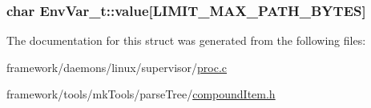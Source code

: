 \subsubsection[{\texorpdfstring{value}{value}}]{\setlength{\rightskip}{0pt plus 5cm}char Env\+Var\+\_\+t\+::value\mbox{[}{\bf L\+I\+M\+I\+T\+\_\+\+M\+A\+X\+\_\+\+P\+A\+T\+H\+\_\+\+B\+Y\+T\+ES}\mbox{]}}\hypertarget{struct_env_var__t_a890bd50fbcfca41f847ebe31bef43b54}{}\label{struct_env_var__t_a890bd50fbcfca41f847ebe31bef43b54}


The documentation for this struct was generated from the following files\+:\begin{DoxyCompactItemize}
\item 
framework/daemons/linux/supervisor/\hyperlink{proc_8c}{proc.\+c}\item 
framework/tools/mk\+Tools/parse\+Tree/\hyperlink{compound_item_8h}{compound\+Item.\+h}\end{DoxyCompactItemize}

